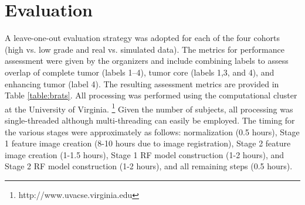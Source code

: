 \documentclass{llncs}
\begin{document}


\section{Evaluation}


A leave-one-out evaluation strategy was adopted for each of the four cohorts (high vs. low grade and real vs. simulated data).  
The metrics for performance assessment were given by the organizers and include 
combining labels to assess overlap of complete tumor (labels 1--4), tumor core (labels 1,3, and 4), and enhancing tumor (label 4).  
The resulting assessment metrics are provided in Table \ref{table:brats}.  All processing was performed using the computational cluster at the University of Virginia.%
\footnote{
http://www.uvacse.virginia.edu
}
Given the number of subjects, all processing was single-threaded although multi-threading
can easily be employed.  The timing for the various stages were approximately as follows:
normalization (0.5 hours), Stage 1 feature image creation (8-10 hours due to image registration), Stage 2 feature image creation (1-1.5 hours), Stage 1 RF model construction (1-2 hours), and Stage 2 RF model construction (1-2 hours), and all remaining steps (0.5 hours).  
\end{document}
